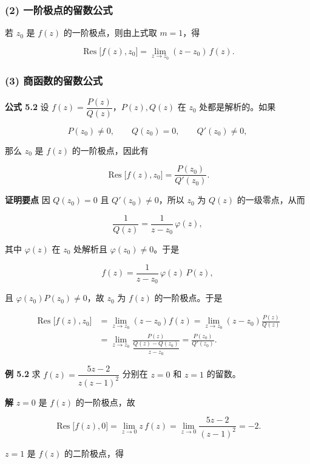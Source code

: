 \subsubsection{(2)
一阶极点的留数公式}\label{ux4e00ux9636ux6781ux70b9ux7684ux7559ux6570ux516cux5f0f}

若 \(z_0\) 是 \(f(z)\) 的一阶极点，则由上式取 \(m=1\)，得

\[
\operatorname{Res}\bigl[f(z),z_0\bigr]
=\lim_{z\to z_0}(z-z_0)\,f(z).
\]

\subsubsection{(3)
商函数的留数公式}\label{ux5546ux51fdux6570ux7684ux7559ux6570ux516cux5f0f}

\textbf{公式 5.2} 设 \(f(z)=\dfrac{P(z)}{Q(z)}\)，\(P(z),Q(z)\) 在
\(z_0\) 处都是解析的。如果

\[
P(z_0)\neq0,\qquad Q(z_0)=0,\qquad Q'(z_0)\neq0,
\]

那么 \(z_0\) 是 \(f(z)\) 的一阶极点，因此有

\[
\operatorname{Res}\bigl[f(z),z_0\bigr]=\frac{P(z_0)}{Q'(z_0)}.
\]

\textbf{证明要点} 因 \(Q(z_0)=0\) 且 \(Q'(z_0)\neq0\)，所以 \(z_0\) 为
\(Q(z)\) 的一级零点，从而

\[
\frac{1}{Q(z)}=\frac{1}{z-z_0}\,\varphi(z),
\]

其中 \(\varphi(z)\) 在 \(z_0\) 处解析且 \(\varphi(z_0)\neq0\)。于是

\[
f(z)=\frac{1}{z-z_0}\,\varphi(z)\,P(z),
\]

且 \(\varphi(z_0)P(z_0)\neq0\)，故 \(z_0\) 为 \(f(z)\) 的一阶极点。于是

\[
\begin{aligned}
\operatorname{Res}\bigl[f(z),z_0\bigr]
&=\lim_{z\to z_0}(z-z_0)f(z)
=\lim_{z\to z_0}(z-z_0)\frac{P(z)}{Q(z)}\\
&=\lim_{z\to z_0}\frac{P(z)}{\dfrac{Q(z)-Q(z_0)}{z-z_0}}
=\frac{P(z_0)}{Q'(z_0)}.
\end{aligned}
\]

\textbf{例 5.2} 求 \(f(z)=\dfrac{5z-2}{z(z-1)^{2}}\) 分别在 \(z=0\) 和
\(z=1\) 的留数。

\textbf{解} \(z=0\) 是 \(f(z)\) 的一阶极点，故

\[
\operatorname{Res}\bigl[f(z),0\bigr]
=\lim_{z\to0}z\,f(z)
=\lim_{z\to0}\frac{5z-2}{(z-1)^{2}}=-2 .
\]

\(z=1\) 是 \(f(z)\) 的二阶极点，得

